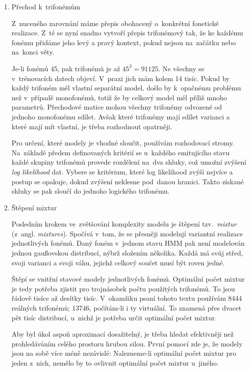 \begin{enumerate}
\item{Přechod k~trifonémům}
\label{item:htktrain:triphones}

Z~nuceného zarovnání máme přepis obohacený o~konkrétní fonetické realizace. Z~té
se nyní snadno vytvoří přepis trifonémový tak, že ke každému fonému přidáme
jeho levý a pravý kontext, pokud nejsou na~začátku nebo na~konci věty.

Je-li fonémů 45, pak trifonémů je až $45^3 = 91125$. Ne všechny se v~trénovacích
datech objeví. V~praxi jich mám kolem 14 tisíc. Pokud by každý trifoném měl
vlastní separátní model, došlo by k~opačnému problému než v~případě monofonémů,
totiž že by celkový model měl příliš mnoho parametrů. Přechodové matice mohou
všechny trifonémy odvozené od jednoho monofonému sdílet. Avšak které trifonémy
mají sdílet varianci a které mají mít vlastní, je třeba rozhodnout opatrněji.

Pro určení, které modely je vhodné sloučit, používám rozhodovací stromy.
Na~základě předem definovaných kritérií se u~každého emitujícího stavu každé
skupiny trifonémů provede rozdělení na~dva shluky, což umožní zvýšení
\textit{log likelihood} dat. Vybere se kritérium, které log likelihood
zvýší nejvíce a postup se opakuje, dokud zvýšení neklesne pod~danou hranici.
Takto získané shluky se pak sloučí do jednoho logického trifonému.

\item{Štěpení mixtur}

Posledním krokem ve~zvětšování komplexity modelu je štěpení tzv.~\textit{mixtur}
(z~angl. \textit{mixtures}). Spočívá v~tom, že se přesněji modelují variantní
realizace jednotlivých fonémů. Daný foném v~jednom stavu HMM pak není modelován jednou gaußovskou
distribucí, nýbrž složením několika. Každá má svůj střed, svoji varianci a svoji
váhu, jejichž celkový součet musí být roven jedné.

Štěpí se vnitřní stavové modely jednotlivých fonémů. Optimální počet
mixtur je tedy potřeba zjistit pro trojnásobek počtu použitých trifonémů. To
jsou řádově tisíce až desítky tisíc. V~okamžiku psaní tohoto textu používám 8444
reálných trifonémů; 13746, počítám-li i ty virtuální. To znamená přes dvacet pět
tisíc distribucí, u~nichž je potřeba určit optimální počet mixtur.

Aby byl úkol aspoň aproximací dosažitelný, je třeba hledat efektivněji než
prohledáváním celého prostoru hrubou silou. První pomocí zde je, že modely jsou
na sobě více méně nezávislé: Nalezneme-li optimální počet mixtur pro jeden
z~nich, nemělo by to ovlivnit optimální počet mixtur u~jiného.


\end{enumerate}
